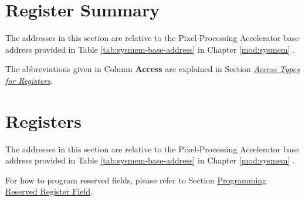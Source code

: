 \documentclass[main\_\_EN.tex]{subfiles}
\begin{document}
\section{Register Summary}
\label{sec:ppa-reg-summ}

The addresses in this section are relative to the Pixel-Processing Accelerator base address provided in Table \ref{tab:sysmem-base-address} in Chapter \ref{mod:sysmem} \textit{}.

The abbreviations given in Column \textbf{Access} are explained in Section \hyperref[glossary-access-types]{\textit{Access Types for Registers}}.






\newpage
\section{Registers}

The addresses in this section are relative to the Pixel-Processing Accelerator base address provided in Table \ref{tab:sysmem-base-address} in Chapter \ref{mod:sysmem} \textit{}.

For how to program reserved fields, please refer to Section \hyperref[programming-reserved-field]{Programming Reserved Register Field}.


\end{document}

